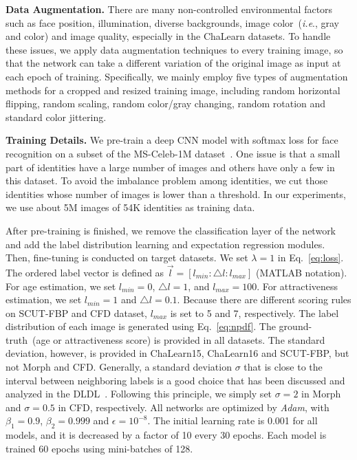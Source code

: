 \documentclass[5p,times,twocolumn]{elsarticle}
\makeatletter
\DeclareRobustCommand\onedot{\@onedot}
\def\@onedot{.}
\def\ie{\emph{i.e}\onedot}
\makeatother
\begin{document}
\textbf{Data Augmentation.} There are many non-controlled environmental factors such as face position, illumination, diverse backgrounds, image color~(\ie, gray and color) and image quality, especially in the ChaLearn datasets. To handle these issues, we apply data augmentation techniques to every training image, so that the network can take a different variation of the original image as input at each epoch of training. Specifically, we mainly employ five types of augmentation methods for a cropped and resized training image, including random horizontal flipping, random scaling, random color/gray changing, random rotation and standard color jittering.

\textbf{Training Details.} We pre-train a deep CNN model with softmax loss for face recognition on a subset of the MS-Celeb-1M dataset~\cite{guo2016ms}. One issue is that a small part of identities have a large number of images and others have only a few in this dataset. To avoid the imbalance problem among identities, we cut those identities whose number of images is lower than a threshold. In our experiments, we use about 5M images of 54K identities as training data.

After pre-training is finished, we remove the classification layer of the network and add the label distribution learning and expectation regression modules. Then, fine-tuning is conducted on target datasets. We set $\lambda=1$ in Eq.~\eqref{eq:loss}. The ordered label vector is defined as $\vec l =[l_{min}:\bigtriangleup l:l_{max}]$ (MATLAB notation). For age estimation, we set $l_{min}=0$, $\bigtriangleup l=1$, and $l_{max}=100$. For attractiveness estimation, we set $l_{min}=1$ and $\bigtriangleup l=0.1$. Because there are different scoring rules on SCUT-FBP and CFD dataset, $l_{max}$ is set to 5 and 7, respectively. The label distribution of each image is generated using Eq.~\eqref{eq:npdf}. The ground-truth~(age or attractiveness score) is provided in all datasets. The standard deviation, however, is provided in ChaLearn15, ChaLearn16 and SCUT-FBP, but not Morph and CFD. {Generally, a standard deviation $\sigma$ that is close to the interval between neighboring labels is a good choice that has been discussed and analyzed in the DLDL~\cite{gao2017deep}.  Following this principle,} we simply set $\sigma=2$ in Morph and $\sigma=0.5$ in CFD, respectively. All networks are optimized by \emph{Adam}, with $\beta_1=0.9$, $\beta_2=0.999$ and $\epsilon=10^{-8}$. The initial learning rate is 0.001 for all models, and it is decreased by a factor of 10 every 30 epochs. Each model is trained 60 epochs using mini-batches of 128.
\end{document}
